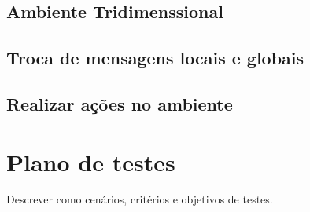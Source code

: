 \subsection{Ambiente Tridimenssional}
\subsection{Troca de mensagens locais e globais}
\subsection{Realizar ações no ambiente}

\section{Plano de testes}

Descrever como cenários, critérios e objetivos de testes.
